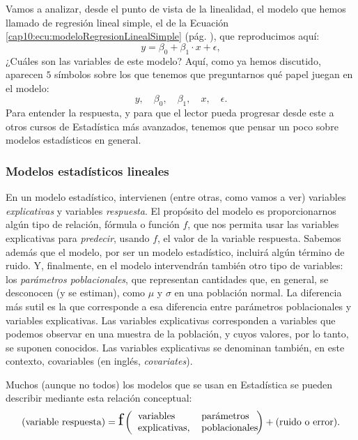 Vamos a analizar, desde el punto de vista de la linealidad,  el modelo que hemos llamado de regresión lineal simple, el de la Ecuación \ref{cap10:ecu:modeloRegresionLinealSimple} (pág. \pageref{cap10:ecu:modeloRegresionLinealSimple}), que reproducimos aquí:
\[y=\beta_0+\beta_1\cdot x+\epsilon,\]
¿Cuáles son las variables de este modelo? Aquí, como ya hemos discutido, aparecen $5$ símbolos sobre los que tenemos que preguntarnos qué papel juegan en el modelo:
\[
y,\quad \beta_0,\quad \beta_1,\quad x,\quad \epsilon.
\]
Para entender la respuesta, y para que el lector pueda progresar desde este a otros cursos de Estadística más avanzados, tenemos que pensar un poco sobre modelos estadísticos en general.

\subsubsection{Modelos estadísticos lineales}
\label{cap10:subsubsec:ModelosEstadisticosLineales}

En un modelo estadístico, intervienen (entre otras, como vamos a ver) variables {\em explicativas} y variables {\em respuesta}. El propósito del modelo es proporcionarnos algún tipo de relación, fórmula o función $f$, que nos permita usar las variables explicativas para {\em predecir}, usando $f$, el valor de la variable respuesta. Sabemos además que el modelo, por ser un modelo estadístico, incluirá algún término de ruido. Y, finalmente, en el modelo intervendrán también otro tipo de variables: los {\em parámetros poblacionales}, que representan cantidades que, en general, se desconocen (y se estiman), como $\mu$ y $\sigma$ en una población normal. La diferencia más sutil es la que corresponde a esa diferencia entre parámetros poblacionales y variables explicativas. Las variables explicativas corresponden a variables que podemos observar en una muestra de la población, y cuyos valores, por lo tanto, se suponen conocidos. Las variables explicativas se denominan también, en este contexto, {\sf covariables} (en inglés, {\em covariates}).

Muchos (aunque no todos) los modelos que se usan en Estadística se pueden describir mediante esta relación conceptual:
{\small
\begin{equation}
\label{cap10:ecu:ModeloEstadisticoGeneral}
    \mbox{(variable respuesta)} =
    \scalebox{1.7}{f}\left(
    \begin{minipage}{4.5cm}
    \begin{tabular}{ll}
    variables& parámetros\\
    explicativas,& poblacionales
    \end{tabular}
    \end{minipage}
    \right)+ \mbox{(ruido o error)}.
\end{equation}
}

